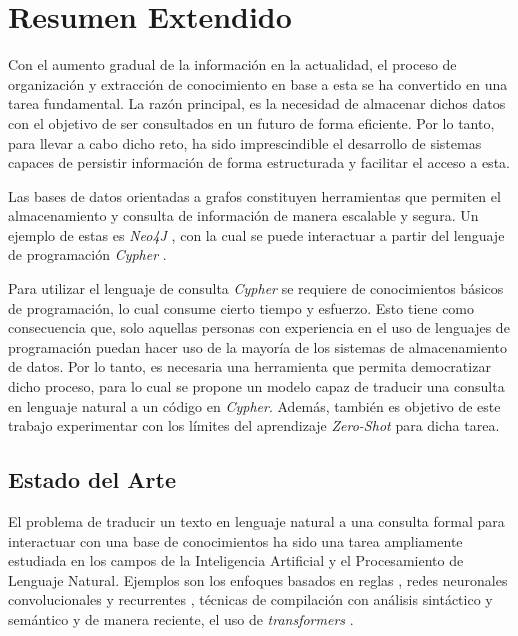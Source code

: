 \documentclass[a4paper,10pt,twocolumn]{article}
\begin{document}
\section{Resumen Extendido}\label{sec:intro}
Con el aumento gradual de la información en la actualidad, el proceso de organización y extracción de conocimiento en base a esta se ha convertido en una tarea fundamental. La razón principal, es la necesidad de almacenar dichos datos con el objetivo de ser consultados en un futuro de forma eficiente. Por lo tanto, para llevar a cabo dicho reto, ha sido imprescindible el desarrollo de sistemas capaces de persistir información de forma estructurada y facilitar el acceso a esta.

Las bases de datos orientadas a grafos \cite{graph_dbs} constituyen herramientas que permiten el almacenamiento y consulta de información de manera escalable y segura. Un ejemplo de estas es \textit{Neo4J} \cite{neo4j}, con la cual se puede interactuar a partir del lenguaje de programación \textit{Cypher} \cite{cypher}.

Para utilizar el lenguaje de consulta \textit{Cypher} se requiere de conocimientos básicos de programación, lo cual consume cierto tiempo y esfuerzo. Esto tiene como consecuencia que, solo aquellas personas con experiencia en el uso de lenguajes de programación puedan hacer uso de la mayoría de los sistemas de almacenamiento de datos. Por lo tanto, es necesaria una herramienta que permita democratizar dicho proceso, para lo cual se propone un modelo capaz de traducir una consulta en lenguaje natural a un código en \textit{Cypher}. Además, también es objetivo de este trabajo experimentar con los límites del aprendizaje \textit{Zero-Shot} \cite{zeroshot} para dicha tarea. 

\subsection{Estado del Arte}
El problema de traducir un texto en lenguaje natural a una consulta formal para interactuar con una base de conocimientos ha sido una tarea ampliamente estudiada en los campos de la Inteligencia Artificial y el Procesamiento de Lenguaje Natural. Ejemplos son los enfoques basados en reglas \cite{rba1}, redes neuronales convolucionales y recurrentes \cite{rnc} \cite{rnr}, técnicas de compilación con análisis sintáctico y semántico \cite{comp} y de manera reciente, el uso de \textit{transformers} \cite{transformers}. 
\end{document}
